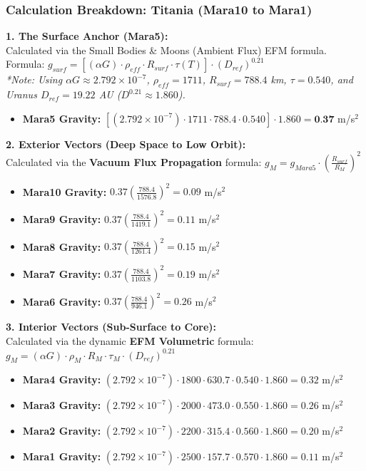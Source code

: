 \documentclass[11pt, a4paper]{article}
\begin{document}
\clearpage
\subsubsection{Calculation Breakdown: Titania (Mara10 to Mara1)}

\noindent \textbf{1. The Surface Anchor (Mara5):} \\
Calculated via the Small Bodies \& Moons (Ambient Flux) EFM formula. \\
Formula: $g_{surf} = \left[ (\alpha G) \cdot \rho_{eff} \cdot R_{surf} \cdot \tau(T) \right] \cdot (D_{ref})^{0.21}$ \\
\textit{*Note: Using $\alpha G \approx 2.792 \times 10^{-7}$, $\rho_{eff} = 1711$, $R_{surf} = 788.4$ km, $\tau = 0.540$, and Uranus $D_{ref} = 19.22$ AU ($D^{0.21} \approx 1.860$).}
\begin{itemize}
  \item \textbf{Mara5 Gravity:} $\left[ (2.792 \times 10^{-7}) \cdot 1711 \cdot 788.4 \cdot 0.540 \right] \cdot 1.860 = \textbf{0.37}$ m/s$^2$
\end{itemize}

\vspace{0.5em}
\noindent \textbf{2. Exterior Vectors (Deep Space to Low Orbit):} \\
Calculated via the \textbf{Vacuum Flux Propagation} formula: $g_M = g_{Mara5} \cdot \left( \frac{R_{surf}}{R_M} \right)^2$
\begin{itemize}
  \item \textbf{Mara10 Gravity:} $0.37 \left( \frac{788.4}{1576.8} \right)^2 = 0.09$ m/s$^2$
  \item \textbf{Mara9 Gravity:} $0.37 \left( \frac{788.4}{1419.1} \right)^2 = 0.11$ m/s$^2$
  \item \textbf{Mara8 Gravity:} $0.37 \left( \frac{788.4}{1261.4} \right)^2 = 0.15$ m/s$^2$
  \item \textbf{Mara7 Gravity:} $0.37 \left( \frac{788.4}{1103.8} \right)^2 = 0.19$ m/s$^2$
  \item \textbf{Mara6 Gravity:} $0.37 \left( \frac{788.4}{946.1} \right)^2 = 0.26$ m/s$^2$
\end{itemize}

\vspace{0.5em}
\noindent \textbf{3. Interior Vectors (Sub-Surface to Core):} \\
Calculated via the dynamic \textbf{EFM Volumetric} formula: $g_M = (\alpha G) \cdot \rho_{M} \cdot R_M \cdot \tau_M \cdot (D_{ref})^{0.21}$
\begin{itemize}
  \item \textbf{Mara4 Gravity:} $(2.792 \times 10^{-7}) \cdot 1800 \cdot 630.7 \cdot 0.540 \cdot 1.860 = 0.32$ m/s$^2$
  \item \textbf{Mara3 Gravity:} $(2.792 \times 10^{-7}) \cdot 2000 \cdot 473.0 \cdot 0.550 \cdot 1.860 = 0.26$ m/s$^2$
  \item \textbf{Mara2 Gravity:} $(2.792 \times 10^{-7}) \cdot 2200 \cdot 315.4 \cdot 0.560 \cdot 1.860 = 0.20$ m/s$^2$
  \item \textbf{Mara1 Gravity:} $(2.792 \times 10^{-7}) \cdot 2500 \cdot 157.7 \cdot 0.570 \cdot 1.860 = 0.11$ m/s$^2$
\end{itemize}
\end{document}

